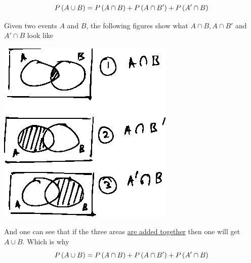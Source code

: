 \documentclass[14pt,fleqn]{extarticle}
\begin{document}
 
\begin{snippet}
    \correct
    
    \[P\left( A\cup B\right) = P\left( A\cap B\right) + P\left( A\cap B'\right) + P\left( A'\cap B\right) \]
    
    \reason
    
    Given two events $A$ and $B$, the following figures show 
    what $A\cap B, A\cap B'$ and $A'\cap B$ look like 
    
    \begin{center}
\includegraphics[scale=1.4]{98-A.eps}
\end{center}

And one can see that if the three areas \underline{are added together} then one will 
get $A\cup B$. Which is why 
\[P\left( A\cup B\right) = P\left( A\cap B\right) + P\left( A\cap B'\right) + P\left( A'\cap B\right) \]
\end{snippet} 
\end{document}

